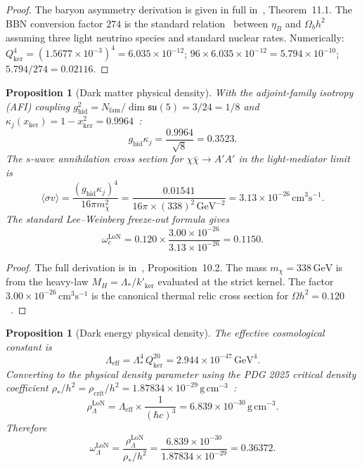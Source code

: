 \documentclass[12pt]{article}
\theoremstyle{plain}
\newtheorem{proposition}[theorem]{Proposition}
\theoremstyle{definition}
\numberwithin{equation}{section}
\newcommand{\kker}{\mathrm{ker}}
\newcommand{\eff}{\mathrm{eff}}
\newcommand{\LoN}{\mathrm{LoN}}
\newcommand{\hid}{\mathrm{hid}}
\newcommand{\crit}{\mathrm{crit}}
\begin{document}
\begin{proof}
The baryon asymmetry derivation is given in full in~\cite{ParticleCosmo},
Theorem~11.1.  The BBN conversion factor $274$ is the standard
relation~\cite{PDG2025} between $\eta_B$ and $\Omega_b h^2$ assuming
three light neutrino species and standard nuclear rates.
Numerically: $Q_{\kker}^4=(1.5677\times10^{-3})^4=6.035\times10^{-12}$;
$96\times6.035\times10^{-12}=5.794\times10^{-10}$;
$5.794/274=0.02116$.
\end{proof}

\begin{proposition}[Dark matter physical density]\label{prop:omegac}
With the adjoint-family isotropy (AFI) coupling
$g_{\hid}^2=N_{\mathrm{fam}}/\dim\mathfrak{su}(5)=3/24=1/8$
and $\kappa_j(x_{\kker})=1-x_{\kker}^2=0.9964$~\cite{ParticleCosmo}:
\begin{equation}
g_{\hid}\kappa_j = \frac{0.9964}{\sqrt{8}} = 0.3523.
\end{equation}
The $s$-wave annihilation cross section for $\chi\bar\chi\to A'A'$
in the light-mediator limit is
\begin{equation}
\langle\sigma v\rangle = \frac{(g_{\hid}\kappa_j)^4}{16\pi m_\chi^2}
= \frac{0.01541}{16\pi\times(338)^2\,\mathrm{GeV}^{-2}}
= 3.13\times10^{-26}\,\mathrm{cm}^3\mathrm{s}^{-1}.
\end{equation}
The standard Lee--Weinberg freeze-out formula gives
\begin{equation}\label{eq:omegac}
\boxed{\omega_c^{\LoN} = 0.120\times\frac{3.00\times10^{-26}}{3.13\times10^{-26}} = 0.1150.}
\end{equation}
\end{proposition}

\begin{proof}
The full derivation is in~\cite{ParticleCosmo}, Proposition~10.2.
The mass $m_\chi=338\,\mathrm{GeV}$ is from the heavy-law
$M_H=\Lambda_*/k'_{\kker}$ evaluated at the strict kernel.
The factor $3.00\times10^{-26}\,\mathrm{cm}^3\mathrm{s}^{-1}$
is the canonical thermal relic cross section for
$\Omega h^2=0.120$~\cite{PDG2025}.
\end{proof}

\begin{proposition}[Dark energy physical density]\label{prop:omegalambda}
The effective cosmological constant is~\cite{ParticleCosmo}
\begin{equation}
\Lambda_{\eff} = \Lambda_*^4\,Q_{\kker}^{20} = 2.944\times10^{-47}\,\mathrm{GeV}^4.
\end{equation}
Converting to the physical density parameter using the PDG 2025
critical density coefficient $\rho_*/h^2=\rho_{\crit}/h^2=1.87834\times10^{-29}\,\mathrm{g\,cm^{-3}}$~\cite{PDG2025}:
\begin{equation}
\rho_\Lambda^{\LoN}
= \Lambda_{\eff}\times\frac{1}{(\hbar c)^3}
= 6.839\times10^{-30}\,\mathrm{g\,cm^{-3}}.
\end{equation}
Therefore
\begin{equation}\label{eq:omegalambda}
\boxed{\omega_\Lambda^{\LoN}
= \frac{\rho_\Lambda^{\LoN}}{\rho_*/h^2}
= \frac{6.839\times10^{-30}}{1.87834\times10^{-29}}
= 0.36372.}
\end{equation}
\end{proposition}
\end{document}
